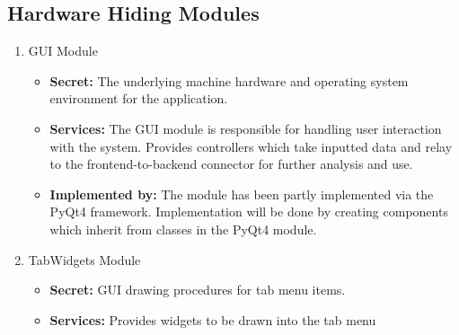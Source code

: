 \documentclass{article}
\begin{document}
\subsection{Hardware Hiding Modules}
\begin{enumerate}
\item
GUI Module

\begin{itemize}
\item
\textbf{Secret:} The underlying machine hardware and operating system environment for the application.

\item
\textbf{Services:} The GUI module is responsible for handling user interaction with the system. Provides controllers which take inputted data and relay to the frontend-to-backend connector for further analysis and use.

\item
\textbf{Implemented by:} The module has been partly implemented via the PyQt4 framework. Implementation will be done by creating components which inherit from classes in the PyQt4 module.
\end{itemize}

\item
TabWidgets Module
\begin{itemize}
\item
\textbf{Secret:} GUI drawing procedures for tab menu items.

\item
\textbf{Services:} Provides widgets to be drawn into the tab menu
\end{itemize}
\end{enumerate}
\end{document}
